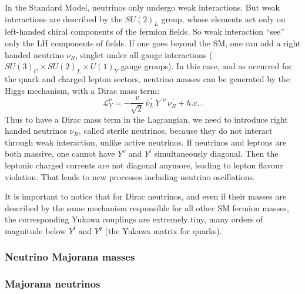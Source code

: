 In the Standard Model, neutrinos only undergo weak interactions.
But weak interactions are described by the $SU(2)_L$ group, whose elements act only on left-handed chiral components of the fermion fields.
So weak interaction ``see'' only the LH components of fields.
If one goes beyond the SM, one can add a right handed neutrino $\nu_R$, singlet under all gauge interactions ($SU(3)_{C}\times SU(2)_{L}\times U(1)_{Y}$ gauge groups).
In this case, and as occurred for the quark and charged lepton sectors, neutrino masses can be generated by the Higgs mechanism, with a Dirac mass term:
\begin{equation}
\mathcal{L}^{\nu}_{Y} = -\frac{v}{\sqrt{2}}\,\overline{\nu}^{\,'}_{L}\,Y^{\,'\nu}\,\nu^{\,'}_{R} + h.c.\,.
\label{eq:dirac_mass_term}
\end{equation}
Thus to have a Dirac mass term in the Lagrangian, we need to introduce right handed neutrinos $\nu_R$, called sterile neutrinos, because they do not interact through weak interaction, unlike active neutrinos.
If neutrinos and leptons are both massive, one cannot have $Y^\nu$ and $Y^l$ simultaneously diagonal.
Then the leptonic charged currents are not diagonal anymore, leading to lepton flavour violation.
That leads to new processes including neutrino oscillations.

It is important to notice that for Dirac neutrinos, and even if their masses are described by the same mechanism responsible for all other SM fermion masses, the corresponding Yukawa couplings are extremely tiny, many orders of magnitude below $Y^l$ and $Y^q$ (the Yukawa matrix for quarks).

\subsubsection{Neutrino Majorana masses}
\label{subsec:maj_mass}

\subsubsection*{Majorana neutrinos}

